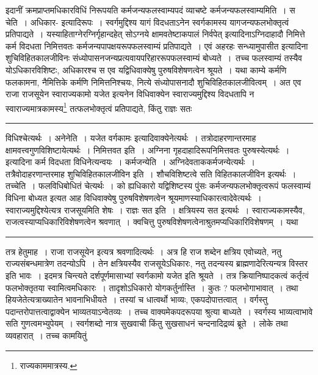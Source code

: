 \documentclass[11pt, openany]{book}
\makeatletter
\def\blfootnote{\gdef\@thefnmark{}\@footnotetext}
\makeatother
\begin{document}
 इदानीं क्रमप्राप्तमधिकारविधिं निरूपयति कर्मजन्यफलस्वाम्यपदं व्याचष्टे {\br कर्मजन्यफलस्वाम्यमिति~। स चेति~।} अधिकार-
\newpage
\fancyhead[LO]{लक्षणम् ]}
{\bl\noindent इत्यादिरूपः~। स्वर्गमुद्दिश्य यागं विदधताऽनेन स्वर्गकामस्य यागजन्यफलभोक्तृत्वं प्रतिपाद्यते~। {\qtl यस्याहिताग्नेरग्निर्गृहान्दहेत् सोऽग्नये क्षामवतेष्टाकपालं निर्वपेत्} इत्यादिनाऽग्निदाहादौ निमित्ते कर्म विदधता निमित्तवतः कर्मजन्यपापक्षयरूपफलस्वाम्यं प्रतिपाद्यते~। एवं {\qtl अहरहः सन्ध्यामुपासीत} इत्यादिना शुचिविहितकालजीविनः संध्योपासनजन्यप्रत्यवायपरिहाररूपफलस्वाम्यं बोध्यते~।\blfootnote{पाठा०\textemdash\ $^{१}$चोद्यते.}\footnotemark\ तच्च
फलस्वाम्यं तस्यैव योऽधिकारविशिष्टः, अधिकारश्च स एव यद्विधिवाक्येषु पुरुषविशेषणत्वेन श्रूयते~। यथा काम्ये कर्मणि फलकामना, नैमित्तिके कर्मणि
निमित्तनिश्चयः, नित्ये संध्योपासनादौ शुचिविहितकालजीवित्वम्~। अत एव {\qtl राजा राजसूयेन स्वाराज्यकामो यजेत} इत्यनेन विधिवाक्येन स्वाराज्यमुद्दिश्य
विदधतापि न स्वाराज्यमात्रकामस्य\footnote{राज्यकाममात्रस्य.} तत्फलभोक्तृत्वं प्रतिपाद्यते, किंतु राज्ञः सतः }\\
\hrule
\vspace{3mm}
\noindent
विधिश्चेत्यर्थः~। {\br अनेनेति~।} {\qt यजेत वर्गकामः} इत्यादिवाक्येनेत्यर्थः~। तत्रोदाहरणान्तरमाह क्षामवत्त्वगुणविशिष्टायेत्यर्थः~। {\br निमित्तवत इति}~। अग्निना गृहदाहादिरूपनिमित्तवतः पुरुषस्येत्यर्थः~। इत्यादिना कर्म विदधता विधिनेत्यन्वयः~। {\br कर्मजन्येति~।} अग्निदेवताककर्मजन्येत्यर्थः~। तत्रैवोदाहरणान्तरमाह {\br शुचिविहितकालजीविन इति~।} शौचविशिष्टत्वे सति विहितकालजीविन इत्यर्थः~। {\br तच्चेति~।}  फलविधिबोधितं चेत्यर्थः~। को ह्यधिकारो यद्विशिष्टस्य पुंसः कर्मजन्यफलभोक्तृत्वरूपं फलस्वाम्यं विधिना बोध्यत इत्यत आह विधिवाक्येषु पुरुषविशेषणत्वेन श्रूयमाणस्याधिकारत्वादेवेत्यर्थः~। स्वाराज्यमुद्दिश्येत्यत्र राजसूयमिति शेषः~। {\br राज्ञः सत इति~।} क्षत्रियस्य सत इत्यर्थः~।
\newpage
\fancyhead[RE]{[ अधिकारविधि\textemdash\ }
{\bl\noindent स्वाराज्यकामस्यैव, राजत्वस्याप्यधिकारिविशेषणत्वेन श्रवणात्~। क्वचित्तु पुरुषविशेषणत्वेनाश्रुतमप्यधिकारिविशेषणम्~। यथा\\} 
\hrule
\vspace{3mm}
\noindent
तत्र हेतुमाह~। {\qt राजा राजसूयेन} इत्यत्र श्रवणादित्यर्थः~। अत्र हि {\qt राज} शब्देन क्षत्रिय एवोच्यते, नतु राज्यसंबन्धमात्रेण तदन्योऽपि~। तेन क्षत्रियस्यैव राजसूयेऽधिकारः, नतु तदन्यस्य ब्राह्मणादेरित्यन्यत्र विस्तर इति भावः~। इदमत्र चिन्त्यते {\qt दर्शपूर्णमासाभ्यां स्वर्गकामो यजेत} इति श्रूयते~। तत्र क्रियानिष्पादकत्वं कर्तृत्वं फलभोक्तृतया स्वामित्वमधिकारः~। तादृशोऽधिकारो योगकर्तुर्नास्ति~। कुतः ? फलभोगाभावात्~। तथा हि\textendash यजेतेत्यत्राख्यातेन भावनाभिधीयते~। तस्यां च धात्वर्थो भाव्यः, एकपदोपात्तत्वात्~। वर्गस्तु पदान्तरोपात्तत्वाद्वाक्येन भाव्यतयाऽन्वेतव्यः~। तच्च वाक्यमेकपदरूपया श्रुत्या बाध्यते~। स्वर्गस्य भाव्यत्वाभावे सति गुणत्वमभ्युपेयम्~। स्वर्गशब्दो नात्र सुखवाची किंतु सुखसाधनं चन्दनादिद्रव्यं ब्रूते~। लोके तथा व्यवहारात्~। तच्च कामयितुं
\end{document}
